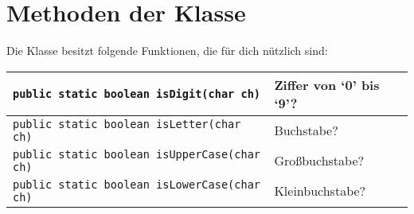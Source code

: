 \pagebreak

\section{Methoden der Klasse }

Die Klasse  besitzt folgende Funktionen, die für dich
nützlich sind:

\bgroup
\def\arraystretch{1.2}
\begin{tabularx}{\textwidth}{|p{85mm}|X|}
\hline
\lstinline|public static boolean isDigit(char ch)| & 
Ziffer von ‘0’ bis ‘9’?
\\ \hline
\lstinline|public static boolean isLetter(char ch)| & 
Buchstabe?
\\ \hline
\lstinline|public static boolean isUpperCase(char ch)| & 
Großbuchstabe?
\\ \hline
\lstinline|public static boolean isLowerCase(char ch)| & 
Kleinbuchstabe?
\\ \hline
\end{tabularx}
\egroup
